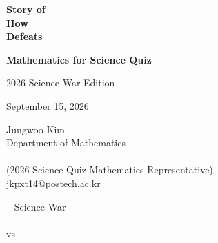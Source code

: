\documentclass[11pt,oneside]{book}
\begin{document}

    \begin{titlepage}
        \centering

        \vspace*{2.4cm}

        {\Huge\bfseries Story of\\[0.35em]
        How \POSTECH\\[0.35em]
        Defeats \KAIST\par}

        \vspace{0.7cm}

        {\LARGE\bfseries Mathematics for Science Quiz\par}

        \vspace{0.55cm}

        {\large 2026 Science War Edition\par}
        {\normalsize September 15, 2026\par}

        \vspace{1.15cm}

        {\large
        Jungwoo Kim\\
        Department of Mathematics\\
        \PohangUniversityOfScienceAndTechnology\\
        (2026 Science Quiz Mathematics Representative)\\
        jkpxt14@postech.ac.kr
        \par}

        \vfill

        {\large
        \POSTECH--\KAIST{} Science War\\[0.7em]
        \PohangUniversityOfScienceAndTechnology\\
        vs\\
        \KoreaAdvancedInstituteOfScienceAndTechnology
        \par}

        \vspace{0.3cm}

    \end{titlepage}


    

    

    \tableofcontents
\end{document}
